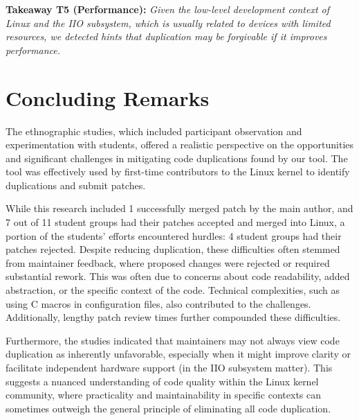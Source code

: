 \documentclass[10pt,conference]{IEEEtran}
\newenvironment{takeaway}[1]{%
  \begin{tcolorbox}
  \textbf{#1:} \itshape}{\end{tcolorbox}}
\begin{document}
\begin{takeaway}{Takeaway T5 (Performance)}
  Given the low-level development context of Linux and the IIO subsystem, which
  is usually related to devices with limited resources, we detected hints that
  duplication may be forgivable if it improves performance.
\end{takeaway}

\section{Concluding Remarks}

The ethnographic studies, which included participant observation and experimentation with students, offered a realistic perspective on the opportunities and significant challenges in mitigating code duplications found by our tool. The tool was effectively used by first-time contributors to the Linux kernel to identify duplications and submit patches.

While this research included 1 successfully merged patch by the main author, and 7 out of 11 student groups had their patches accepted and merged into Linux, a portion of the students' efforts encountered hurdles: 4 student groups had their patches rejected.
Despite reducing duplication, these difficulties often stemmed from maintainer feedback, where proposed changes were rejected or required substantial rework. This was often due to concerns about code readability, added abstraction, or the specific context of the code. Technical complexities, such as using C macros in configuration files, also contributed to the challenges. Additionally, lengthy patch review times further compounded these difficulties.

Furthermore, the studies indicated that maintainers may not always view code duplication as inherently unfavorable, especially when it might improve clarity or facilitate independent hardware support (in the IIO subsystem matter). This suggests a nuanced understanding of code quality within the Linux kernel community, where practicality and maintainability in specific contexts can sometimes outweigh the general principle of eliminating all code duplication.






\end{document}
